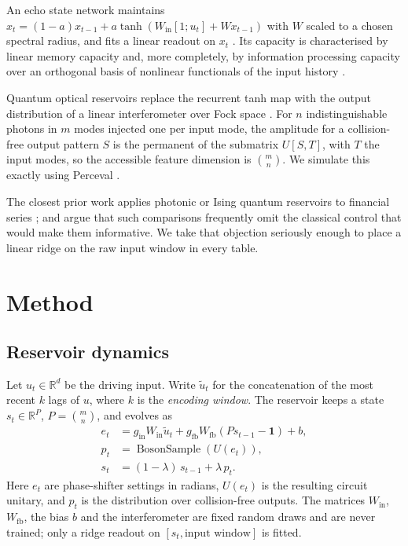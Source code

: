 \documentclass[11pt]{article}
\begin{document}
An echo state network maintains $x_t = (1-a)x_{t-1} + a\tanh(W_{\text{in}}[1;u_t] + Wx_{t-1})$
with $W$ scaled to a chosen spectral radius, and fits a linear readout on $x_t$
\citep{jaeger2001esn}. Its capacity is characterised by linear memory capacity
\citep{jaeger2001esn} and, more completely, by information processing capacity over an
orthogonal basis of nonlinear functionals of the input history \citep{dambre2012ipc}.

Quantum optical reservoirs replace the recurrent tanh map with the output distribution of a
linear interferometer over Fock space \citep{garciabeni2023scalable, nerenberg2025photonquarc}.
For $n$ indistinguishable photons in $m$ modes injected one per input mode, the amplitude for
a collision-free output pattern $S$ is the permanent of the submatrix $U[S,T]$, with $T$ the
input modes, so the accessible feature dimension is $\binom{m}{n}$. We simulate this exactly
using Perceval \citep{heurtel2023perceval}.

The closest prior work applies photonic or Ising quantum reservoirs to financial series
\citep{amanov2026hpqrc, li2025qrcrv}; \citet{branco2024hardtobeat} and \citet{bienstman2025nalm}
argue that such comparisons frequently omit the classical control that would make them
informative. We take that objection seriously enough to place a linear ridge on the raw input
window in every table.

\section{Method}\label{sec:method}

\subsection{Reservoir dynamics}

Let $u_t \in \mathbb{R}^{d}$ be the driving input. Write $\tilde{u}_t$ for the concatenation of
the most recent $k$ lags of $u$, where $k$ is the \emph{encoding window}. The reservoir keeps a
state $s_t \in \mathbb{R}^{P}$, $P = \binom{m}{n}$, and evolves as
\begin{align}
  e_t &= g_{\text{in}} W_{\text{in}} \tilde{u}_t
       + g_{\text{fb}} W_{\text{fb}}\!\left(P s_{t-1} - \mathbf{1}\right) + b, \label{eq:encode}\\
  p_t &= \operatorname{BosonSample}\!\left(U(e_t)\right), \label{eq:optics}\\
  s_t &= (1-\lambda)\, s_{t-1} + \lambda\, p_t. \label{eq:leak}
\end{align}
Here $e_t$ are phase-shifter settings in radians, $U(e_t)$ is the resulting circuit unitary,
and $p_t$ is the distribution over collision-free outputs. The matrices $W_{\text{in}}$,
$W_{\text{fb}}$, the bias $b$ and the interferometer are fixed random draws and are never
trained; only a ridge readout on $[s_t, \text{input window}]$ is fitted.
\end{document}
